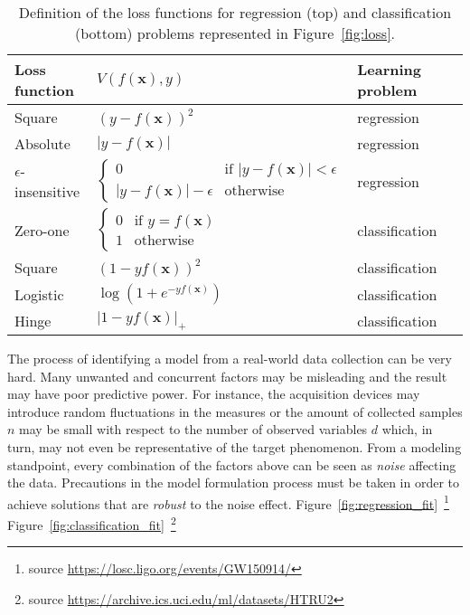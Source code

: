     
    \begin{table}[!h]
    	\centering
    	\caption{Definition of the loss functions for regression (top) and classification (bottom) problems represented in Figure~\ref{fig:loss}.}\label{tab:losses}
    	\begin{tabular}{@{}ll@{}ll@{}}
    		\toprule
    		Loss function & $V(f(\bm{x}),y)$  & Learning problem           \\ \midrule
    		Square                   & $(y - f(\bm{x}))^2$ & regression \\
    		Absolute                 & $|y - f(\bm{x})|$ & regression   \\
    		$\epsilon$-insensitive   & $\begin{cases}
    		0 & \text{if } |y-f(\bm{x})| < \epsilon\\
    		|y-f(\bm{x})| - \epsilon & \text{otherwise}
    		\end{cases} $        & regression                 \\
    		\midrule
    		Zero-one               & $\begin{cases}
    		0 & \text{if } y = f(\bm{x})\\
    		1 & \text{otherwise}
    		\end{cases}$ & classification \\
    		Square                 & $(1 - yf(\bm{x}))^2$ & classification  \\
    		Logistic                 & $\log(1 + e^{-yf(\bm{x})})$ & classification  \\
    		Hinge                 & $|1 - yf(\bm{x})|_+$ & classification  \\
    		\bottomrule
    	\end{tabular}
    \end{table}
        
    The process of identifying a model from a real-world data collection can be very hard. Many unwanted and concurrent factors may be misleading and the result may have poor predictive power. For instance, the acquisition devices may introduce random fluctuations in the measures or the amount of collected samples $n$ may be small with respect to the number of observed variables $d$ which, in turn, may not even be representative of the target phenomenon. From a modeling standpoint, every combination of the factors above can be seen as \textit{noise} affecting the data. Precautions in the model formulation process must be taken in order to achieve solutions that are \textit{robust} to the noise effect. 
    Figure~\ref{fig:regression_fit}~\footnote{source \url{https://losc.ligo.org/events/GW150914/}}
    Figure~\ref{fig:classification_fit}~\footnote{source \url{https://archive.ics.uci.edu/ml/datasets/HTRU2}}
    
